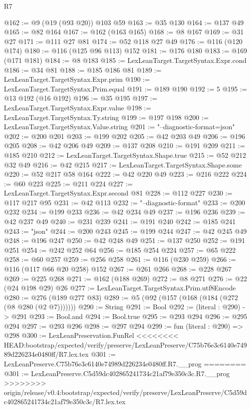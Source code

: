 \begin{lexlean}{R7}
\begin{coremodule}
{{{{{{{{{{{{{@162 := @9 (@19 (@93 @20)) @103 @59
@163 := @35 @130
@164 := @137 @49
@165 := @82 @164
@167 := @162 (@163 @165)
@168 := @8 @167
@169 := @31 @27
@171 := @111 @27 @81
@174 := @52 @118 @27 @49
@176 := @116 (@120 @174)
@180 := @116 (@125 @96 @113) @152
@181 := @176 @180
@183 := @169 (@171 @181)
@184 := @8 @183
@185 := LexLeanTarget.TargetSyntax.Expr.cond
@186 := @34 @81
@188 := @185 @186 @81
@189 := LexLeanTarget.TargetSyntax.Expr.prim
@190 := LexLeanTarget.TargetSyntax.Prim.equal
@191 := @189 @190
@192 := 5
@195 := @13 @192 (@16 @192)
@196 := @35 @195
@197 := LexLeanTarget.TargetSyntax.Expr.value
@198 := LexLeanTarget.TargetSyntax.Ty.string
@199 := @197 @198
@200 := LexLeanTarget.TargetSyntax.Value.string
@201 := "--diagnostic-format=json"
@202 := @200 @201
@203 := @199 @202
@205 := @42 @203 @49
@206 := @196 @205
@208 := @42 @206 @49
@209 := @137 @208
@210 := @191 @209
@211 := @185 @210
@212 := LexLeanTarget.TargetSyntax.Shape.true
@215 := @52 @212 @32 @49
@216 := @42 @215
@217 := LexLeanTarget.TargetSyntax.Shape.some
@220 := @52 @217 @58 @164
@222 := @42 @220 @49
@223 := @216 @222
@224 := @60 @223
@225 := @211 @224
@227 := LexLeanTarget.TargetSyntax.Expr.second @81
@228 := @112 @227
@230 := @117 @217 @95
@231 := @42 @113
@232 := "--diagnostic-format"
@233 := @200 @232
@234 := @199 @233
@236 := @42 @234 @49
@237 := @196 @236
@239 := @42 @237 @49
@240 := @231 @239
@241 := @191 @240
@242 := @185 @241
@243 := "json"
@244 := @200 @243
@245 := @199 @244
@247 := @42 @245 @49
@248 := @196 @247
@250 := @42 @248 @49
@251 := @137 @250
@252 := @191 @251
@254 := @242 @252 @64
@256 := @185 @254 @224
@257 := @65 @222
@258 := @60 @257
@259 := @256 @258
@261 := @116 (@230 @259)
@266 := @116 (@117 @66 @20 @258) @152
@267 := @261 @266
@268 := @228 @267
@269 := @225 @268
@271 := @162 (@188 @269)
@272 := @8 @271
@276 := @22 (@24 @198 @29) @26
@277 := LexLeanTarget.TargetSyntax.Prim.utf8Encode
@280 := @276 (@189 @277 @83)
@289 := @5 (@92 (@157 (@168 (@184 (@272 (@8 @280 (@2 @7)))))))
@290 := String
@291 := Bool
@292 := (literal : @290) -> @291
@293 := Bool.and
@294 := Bool.true
@295 := @293 @294
@296 := @295 @294
@297 := @293 @296
@298 := @297 @294
@299 := fun (literal : @290) => @298
@300 := LexLeanPreservation.FunRel
<<<<<<<< HEAD:bootstrap/expected/verify/preserve/LexLeanPreserve/C75b76e3c6140e74989d226234e0480ff/R7.lex.tex
@301 := LexLeanPreserve.C75b76e3c6140e74989d226234e0480ff.R7.__prog
========
@301 := LexLeanPreserve.C5d59dc402865241734c21af79e350c3c.R7.__prog
>>>>>>>> origin/release/v0.4:bootstrap/expected/verify/preserve/LexLeanPreserve/C5d59dc402865241734c21af79e350c3c/R7.lex.tex
}}}}}}}}}}}}}
\end{coremodule}
\end{lexlean}
